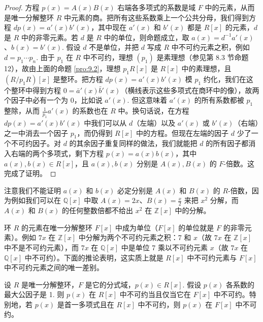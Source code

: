 \begin{proof}
方程 \(p(x) = A(x)B(x)\) 右端各多项式的系数是域 \(F\) 中的元素，从而是唯一分解整环 \(R\) 中元素的商。把所有这些系数乘上一个公共分母，我们得到方程 \(dp(x) = a'(x)b'(x)\)，其中现在 \(a'(x)\) 和 \(b'(x)\) 都是 \(R[x]\) 的元素，\(d\) 是 \(R\) 中的非零元素。若 \(d\) 是 \(R\) 中的单位，则命题成立，取 \(a(x) = d^{-1}a'(x)\)、\(b(x) = b'(x)\). 假设 \(d\) 不是单位，并把 \(d\) 写成 \(R\) 中不可约元素之积，例如 \(d = p_1\cdots p_n\). 由于 \(p_1\) 在 \(R\) 中不可约，理想 \((p_1)\) 是素理想（参见第 8.3 节命题 12），故由上面的命题 \ref{pro:9.2}，理想 \(p_1R[x]\) 是 \(R[x]\) 中的素理想，且 \((R/p_1R)[x]\) 是整环。把方程 \(dp(x) = a'(x)b'(x)\) 模 \(p_1\) 约化，我们在这个整环中得到方程 \(0 = \bar{a}'(x)\bar{b}'(x)\)（横线表示这些多项式在商环中的像），故两个因子中必有一个为 0，比如说 \(a'(x)\). 但这意味着 \(a'(x)\) 的所有系数都被 \(p_1\) 整除，从而 \(\frac{1}{p_1}a'(x)\) 的系数也在 \(R\) 中。换句话说，在方程 \(dp(x) = a'(x)b'(x)\) 中我们可以从 \(d\)（左端）以及 \(a'(x)\) 或 \(b'(x)\)（右端）之一中消去一个因子 \(p_1\)，而仍得到 \(R[x]\) 中的方程。但现在左端的因子 \(d\) 少了一个不可约因子。对 \(d\) 的其余因子重复同样的做法，我们就能把 \(d\) 的所有因子都消入右端的两个多项式，剩下方程 \(p(x) = a(x)b(x)\)，其中 \(a(x), b(x) \in R[x]\)，且 \(a(x), b(x)\) 分别是 \(A(x), B(x)\) 的 \(F\)-倍数。这完成了证明。
\end{proof}

注意我们不能证明 \(a(x)\) 和 \(b(x)\) 必定分别是 \(A(x)\) 和 \(B(x)\) 的 \(R\)-倍数，因为例如我们可以在 \(\mathbb{Q}[x]\) 中取 \(A(x) = 2x\)、\(B(x) = \frac{x}{2}\) 来把 \(x^2\) 分解，而 \(A(x)\) 和 \(B(x)\) 的任何整数倍都不给出 \(x^2\) 在 \(\mathbb{Z}[x]\) 中的分解。

环 \(R\) 的元素在唯一分解整环 \(F[x]\) 中成为单位（\(F[x]\) 的单位就是 \(F\) 的非零元素）。例如 \(7x\) 在 \(\mathbb{Z}[x]\) 中分解为两个不可约元素之积：7 和 \(x\)（故 \(7x\) 在 \(\mathbb{Z}[x]\) 中不是不可约元素），而 \(7x\) 在 \(\mathbb{Q}[x]\) 中是单位 7 乘以不可约元素 \(x\)（故 \(7x\) 在 \(\mathbb{Q}[x]\) 中不可约）。下面的推论表明，这实质上就是 \(R[x]\) 中不可约元素与 \(F[x]\) 中不可约元素之间的唯一差别。

\begin{corollary}\label{cor:9.6}
设 \(R\) 是唯一分解整环，\(F\) 是它的分式域，\(p(x) \in R[x]\). 假设 \(p(x)\) 各系数的最大公因子是 1. 则 \(p(x)\) 在 \(R[x]\) 中不可约当且仅当它在 \(F[x]\) 中不可约。特别地，若 \(p(x)\) 是首一多项式且在 \(R[x]\) 中不可约，则 \(p(x)\) 在 \(F[x]\) 中不可约。
\end{corollary}

